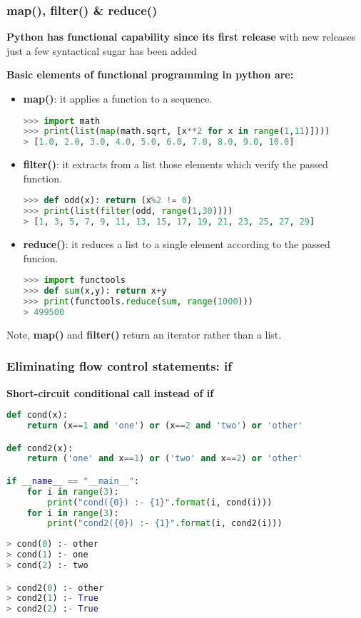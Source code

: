 \subsubsection{map(), filter() \& reduce()}

\textbf{Python has functional capability since its first release}
with new  releases just a few syntactical sugar has been added

\textbf{Basic elements of functional programming in python are:}
\begin{itemize}
	\item \textbf{map()}: it applies a function to a sequence.
\begin{lstlisting}[language=Python]
>>> import math
>>> print(list(map(math.sqrt, [x**2 for x in range(1,11)])))
> [1.0, 2.0, 3.0, 4.0, 5.0, 6.0, 7.0, 8.0, 9.0, 10.0]
\end{lstlisting}
	\item \textbf{filter()}: it extracts from a list those elements which verify the passed function.
\begin{lstlisting}[language=Python]
>>> def odd(x): return (x%2 != 0)
>>> print(list(filter(odd, range(1,30))))
> [1, 3, 5, 7, 9, 11, 13, 15, 17, 19, 21, 23, 25, 27, 29]
\end{lstlisting}
\item \textbf{reduce()}: it reduces a list to a single element according to the passed funcion.
\begin{lstlisting}[language=Python]
>>> import functools
>>> def sum(x,y): return x+y
>>> print(functools.reduce(sum, range(1000)))
> 499500
\end{lstlisting}
\end{itemize}

Note, \textbf{map()} and \textbf{filter()} return an iterator rather than a list.

\subsubsection{Eliminating flow control statements: if}
\textbf{Short-circuit conditional call instead of if}
\begin{lstlisting}[language=Python]
def cond(x):
	return (x==1 and 'one') or (x==2 and 'two') or 'other'

def cond2(x):
	return ('one' and x==1) or ('two' and x==2) or 'other'

if __name__ == "__main__":
	for i in range(3):
		print("cond({0}) :- {1}".format(i, cond(i)))
	for i in range(3):
		print("cond2({0}) :- {1}".format(i, cond2(i)))
\end{lstlisting}
\begin{lstlisting}[language=Python]
> cond(0) :- other
> cond(1) :- one
> cond(2) :- two

> cond2(0) :- other
> cond2(1) :- True
> cond2(2) :- True
\end{lstlisting}

